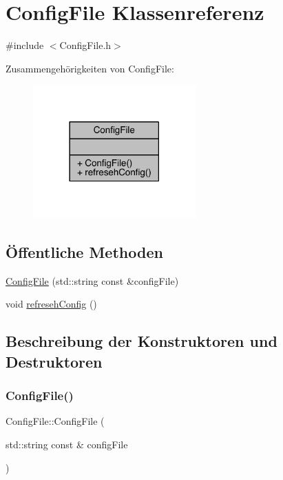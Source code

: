 \hypertarget{class_config_file}{}\section{Config\+File Klassenreferenz}
\label{class_config_file}


{\ttfamily \#include $<$Config\+File.\+h$>$}



Zusammengehörigkeiten von Config\+File\+:
\nopagebreak
\begin{figure}[H]
\begin{center}
\leavevmode
\includegraphics[width=177pt]{class_config_file__coll__graph}
\end{center}
\end{figure}
\subsection*{Öffentliche Methoden}
\begin{DoxyCompactItemize}
\item 
\hyperlink{class_config_file_ab61f21b62426fa46dc4c581d3fdf4e5e}{Config\+File} (std\+::string const \&config\+File)
\item 
void \hyperlink{class_config_file_a48a2e1c781af3f0947c93d1d37e5b71a}{refreseh\+Config} ()
\end{DoxyCompactItemize}


\subsection{Beschreibung der Konstruktoren und Destruktoren}
\hypertarget{class_config_file_ab61f21b62426fa46dc4c581d3fdf4e5e}{}\label{class_config_file_ab61f21b62426fa46dc4c581d3fdf4e5e} 
\subsubsection{\texorpdfstring{Config\+File()}{ConfigFile()}}
{\footnotesize\ttfamily Config\+File\+::\+Config\+File (\begin{DoxyParamCaption}\item[{std\+::string const \&}]{config\+File }\end{DoxyParamCaption})}



